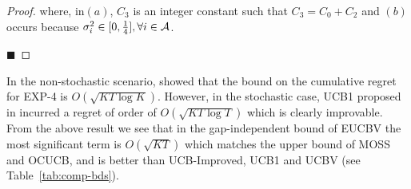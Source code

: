 \begin{proof}
where, in$(a)$, $C_3$ is an integer constant such that $C_3 = C_0 + C_2 $ and $(b)$ occurs because $\sigma_i^2 \in [0,\frac{1}{4}], \forall i\in \mathcal{A}$.

\hfill $\blacksquare$	
\end{proof}


\begin{discussion}
\label{Result:discussion2}
 In the non-stochastic scenario, \citet{auer2002nonstochastic} showed that the bound on the cumulative regret for EXP-4 is $O\left(\sqrt{KT\log K}\right)$. However, in the stochastic case, UCB1 proposed in \citet{auer2002finite} incurred a regret of order of  $O\left(\sqrt{KT\log T}\right)$ which is clearly improvable. From the above result we see that in the gap-independent bound of EUCBV the most significant term is $O\left(\sqrt{KT}\right)$ which  matches the upper bound of MOSS and OCUCB, and is better than UCB-Improved, UCB1 and UCBV (see Table~\ref{tab:comp-bds}).
\end{discussion}


%
%
